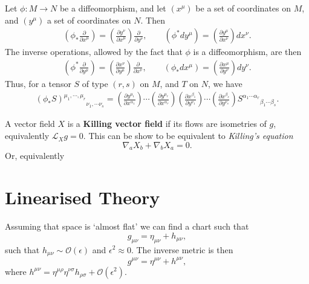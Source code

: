 \documentclass[12pt]{article}
\begin{document}
\begin{noteEquation}
Let $\phi: M \to N$ be a diffeomorphism, and let $(x^\mu)$ be a set of coordinates on $M$, and $(y^\mu)$ a set of coordinates on $N$. Then
\begin{align}
\left( \phi_* \frac{\partial}{\partial x^\mu} \right)
= \left( \frac{\partial y^\nu}{\partial x^ \mu} \right) \frac{\partial }{\partial y^\nu},
\qquad
\left( \phi^* dy^\mu \right) = \left( \frac{\partial y^\mu }{\partial x^\nu} \right) dx^\nu.
\end{align}
The inverse operations, allowed by the fact that $\phi$ is a diffeomorphism, are then
\begin{align}
\left( \phi^* \frac{\partial}{\partial y^\mu} \right)
= \left( \frac{\partial x^\nu}{\partial y^\mu} \right) \frac{\partial}{\partial x^\nu},
\qquad
\left( \phi_* dx^\mu \right)
= \left(\frac{\partial x^\mu }{\partial y^\nu} \right) dy^\nu.
\end{align}
Thus, for a tensor $S$ of type $(r,s)$ on $M$, and $T$ on $N$, we have
\begin{align}
{\left( \phi_* S \right)^{\mu_1, \cdots, \mu_r}}_{\nu_1, \cdots \nu_s} = \left( \frac{\partial y^{\mu_1}}{\partial x^{\alpha_1}}\right) \cdots \left( \frac{\partial y^{\mu_r}}{\partial x^{\alpha_r}}\right)
\left( \frac{\partial x^{\beta_1}}{\partial y^{\nu_1} }\right) \cdots
\left( \frac{\partial x^{\beta_s}}{\partial y^{\nu_s} }\right)
{S^{\alpha_1 \cdots \alpha_r}}_{\beta_1 \cdots \beta_s}.
\end{align}
\end{noteEquation}

\begin{noteEquation}
A vector field $X$ is a \textbf{Killing vector field} if its flows are isometries of $g$, equivalently $\mathcal{L}_X g = 0$. This can be show to be equivalent to \textit{Killing's equation}
\begin{equation}
\nabla_a X_b + \nabla_b X_a = 0.
\end{equation}
Or, equivalently
\end{noteEquation}

\section{Linearised Theory}

\begin{noteEquation}
Assuming that space is `almost flat' we can find a chart such that
\begin{equation}
g_{\mu\nu} = \eta_{\mu\nu} + h_{\mu\nu},
\end{equation}
such that $h_{\mu\nu} \sim \mathcal{O}(\epsilon)$ and $\epsilon^2 \approx 0$. The inverse metric is then
\begin{equation}
g^{\mu \nu} = \eta^{\mu\nu} + h^{\mu\nu},
\end{equation}
where $h^{\mu\nu} = \eta^{\mu\rho} \eta^{\nu\sigma} h_{\rho \sigma} + \mathcal{O}(\epsilon^2)$.
\end{noteEquation}
\end{document}
